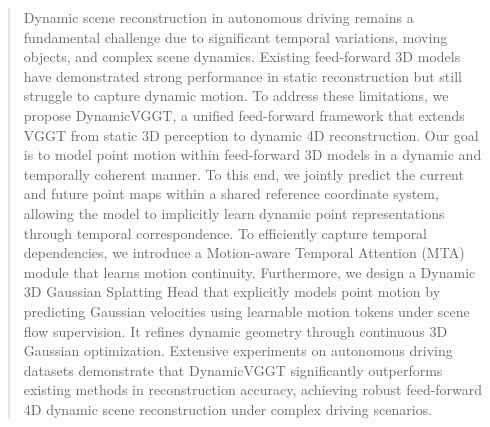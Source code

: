\begin{abstract}
Dynamic scene reconstruction in autonomous driving remains a fundamental challenge due to significant temporal variations, moving objects, and complex scene dynamics. 
Existing feed-forward 3D models have demonstrated strong performance in static reconstruction but still struggle to capture dynamic motion. 
To address these limitations, we propose DynamicVGGT, a unified feed-forward framework that extends VGGT from static 3D perception to dynamic 4D reconstruction. 
Our goal is to model point motion within feed-forward 3D models in a dynamic and temporally coherent manner. 
To this end, we jointly predict the current and future point maps within a shared reference coordinate system, allowing the model to implicitly learn dynamic point representations through temporal correspondence. 
To efficiently capture temporal dependencies, we introduce a Motion-aware Temporal Attention (MTA) module that learns motion continuity. 
Furthermore, we design a Dynamic 3D Gaussian Splatting Head that explicitly models point motion by predicting Gaussian velocities using learnable motion tokens under scene flow supervision. It refines dynamic geometry through continuous 3D Gaussian optimization. 
Extensive experiments on autonomous driving datasets demonstrate that DynamicVGGT significantly outperforms existing methods in reconstruction accuracy, achieving robust feed-forward 4D dynamic scene reconstruction under complex driving scenarios.

\end{abstract}

